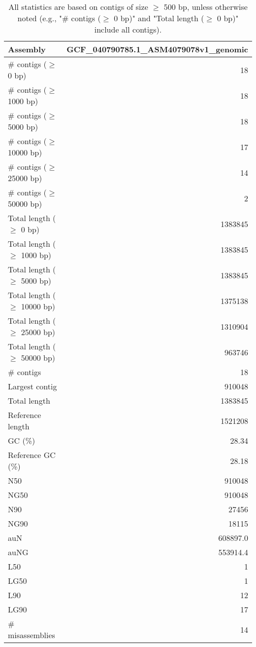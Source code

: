 \documentclass[12pt,a4paper]{article}
\begin{document}
\begin{table}[ht]
\begin{center}
\caption{All statistics are based on contigs of size $\geq$ 500 bp, unless otherwise noted (e.g., "\# contigs ($\geq$ 0 bp)" and "Total length ($\geq$ 0 bp)" include all contigs).}
\begin{tabular}{|l*{1}{|r}|}
\hline
Assembly & GCF\_040790785.1\_ASM4079078v1\_genomic \\ \hline
\# contigs ($\geq$ 0 bp) & 18 \\ \hline
\# contigs ($\geq$ 1000 bp) & 18 \\ \hline
\# contigs ($\geq$ 5000 bp) & 18 \\ \hline
\# contigs ($\geq$ 10000 bp) & 17 \\ \hline
\# contigs ($\geq$ 25000 bp) & 14 \\ \hline
\# contigs ($\geq$ 50000 bp) & 2 \\ \hline
Total length ($\geq$ 0 bp) & 1383845 \\ \hline
Total length ($\geq$ 1000 bp) & 1383845 \\ \hline
Total length ($\geq$ 5000 bp) & 1383845 \\ \hline
Total length ($\geq$ 10000 bp) & 1375138 \\ \hline
Total length ($\geq$ 25000 bp) & 1310904 \\ \hline
Total length ($\geq$ 50000 bp) & 963746 \\ \hline
\# contigs & 18 \\ \hline
Largest contig & 910048 \\ \hline
Total length & 1383845 \\ \hline
Reference length & 1521208 \\ \hline
GC (\%) & 28.34 \\ \hline
Reference GC (\%) & 28.18 \\ \hline
N50 & 910048 \\ \hline
NG50 & 910048 \\ \hline
N90 & 27456 \\ \hline
NG90 & 18115 \\ \hline
auN & 608897.0 \\ \hline
auNG & 553914.4 \\ \hline
L50 & 1 \\ \hline
LG50 & 1 \\ \hline
L90 & 12 \\ \hline
LG90 & 17 \\ \hline
\# misassemblies & 14 \\ \hline

\end{tabular}
\end{center}
\end{table}
\end{document}
